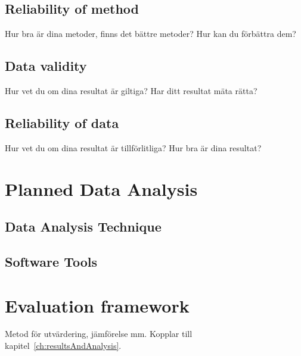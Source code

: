 \subsection{Reliability of method}
\begin{swedishnotes}
	Hur bra är dina metoder, finns det bättre metoder? Hur kan du förbättra dem?
\end{swedishnotes}

\subsection{Data validity}
\begin{swedishnotes}
	Hur vet du om dina resultat är giltiga? Har ditt resultat mäta rätta?
\end{swedishnotes}

\subsection{Reliability of data}
\begin{swedishnotes}
	Hur vet du om dina resultat är tillförlitliga? Hur bra är dina resultat?
\end{swedishnotes}


\section{Planned Data Analysis}
\label{sec:plannedDataAnalysis}

\subsection{Data Analysis Technique}

\subsection{Software Tools}


\section{Evaluation framework}
\label{sec:evaluationFramework}
\begin{swedishnotes}
	Metod för utvärdering, jämförelse mm. Kopplar till kapitel~\ref{ch:resultsAndAnalysis}.
\end{swedishnotes}

